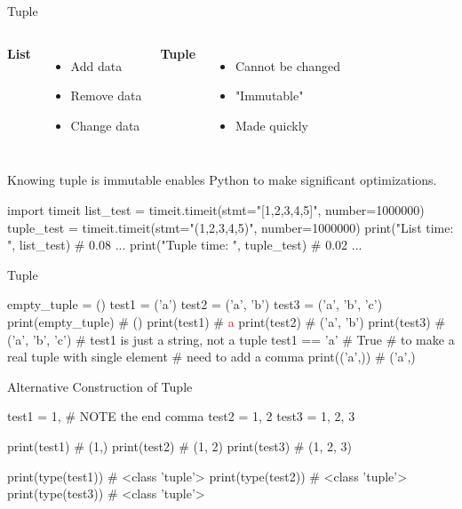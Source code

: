 \documentclass{beamer}
\begin{document}
\begin{frame}[fragile]{Tuple}
\begin{columns}[T]
\textbf{List}
\begin{itemize}
\item Add data
\item Remove data
\item Change data
\end{itemize}
\textbf{Tuple}
\begin{itemize}
\item Cannot be changed
\item "Immutable"
\item Made quickly
\end{itemize}
\end{columns}
\vspace{10pt}
Knowing tuple is immutable enables Python to make 
significant optimizations.
\begin{pythoncode}
import timeit
list_test = timeit.timeit(stmt="[1,2,3,4,5]", 
                          number=1000000)
tuple_test = timeit.timeit(stmt="(1,2,3,4,5)",
                           number=1000000)
print("List time: ", list_test)  # 0.08 ...
print("Tuple time: ", tuple_test)  # 0.02 ...
\end{pythoncode}
\end{frame}

\begin{frame}[fragile]{Tuple}
\begin{pythoncode}
empty_tuple = ()
test1 = ('a')
test2 = ('a', 'b')
test3 = ('a', 'b', 'c')
print(empty_tuple)  # ()
print(test1)        # \textcolor{red}{a}
print(test2)        # ('a', 'b')
print(test3)        # ('a', 'b', 'c')
# test1 is just a string, not a tuple
test1 == 'a'        # True
# to make a real tuple with single element
# need to add a comma
print(('a',))       # ('a',)
\end{pythoncode}
\end{frame}

\begin{frame}[fragile]{Alternative Construction of Tuple}
\begin{pythoncode}
test1 = 1,    # NOTE the end comma
test2 = 1, 2
test3 = 1, 2, 3

print(test1)    # (1,)
print(test2)    # (1, 2)
print(test3)    # (1, 2, 3)

print(type(test1))  # <class 'tuple'> 
print(type(test2))  # <class 'tuple'>
print(type(test3))  # <class 'tuple'>
\end{pythoncode}
\end{frame}
\end{document}
